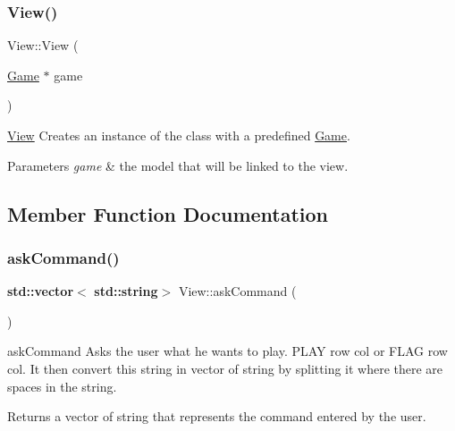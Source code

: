 \subsubsection{\texorpdfstring{View()}{View()}}
{\footnotesize\ttfamily View\+::\+View (\begin{DoxyParamCaption}\item[{\hyperlink{class_game}{Game} $\ast$}]{game }\end{DoxyParamCaption})}



\hyperlink{class_view}{View} Creates an instance of the class with a predefined \hyperlink{class_game}{Game}. 


\begin{DoxyParams}{Parameters}
{\em game} & the model that will be linked to the view. \\
\hline
\end{DoxyParams}


\subsection{Member Function Documentation}
\mbox{\label{class_view_a12e92a6bdfb8a88d1e8e6b334f45ccc2}} 
\subsubsection{\texorpdfstring{ask\+Command()}{askCommand()}}
{\footnotesize\ttfamily \textbf{ std\+::vector}$<$\textbf{ std\+::string}$>$ View\+::ask\+Command (\begin{DoxyParamCaption}{ }\end{DoxyParamCaption})}



ask\+Command Asks the user what he wants to play. \textquotesingle{}P\+L\+AY row col\textquotesingle{} or \textquotesingle{}F\+L\+AG row col\textquotesingle{}. It then convert this string in vector of string by splitting it where there are spaces in the string. 

\begin{DoxyReturn}{Returns}
a vector of string that represents the command entered by the user. 
\end{DoxyReturn}
\mbox{\label{class_view_a543e9350656082efdb604ed224e65aa1}} 
